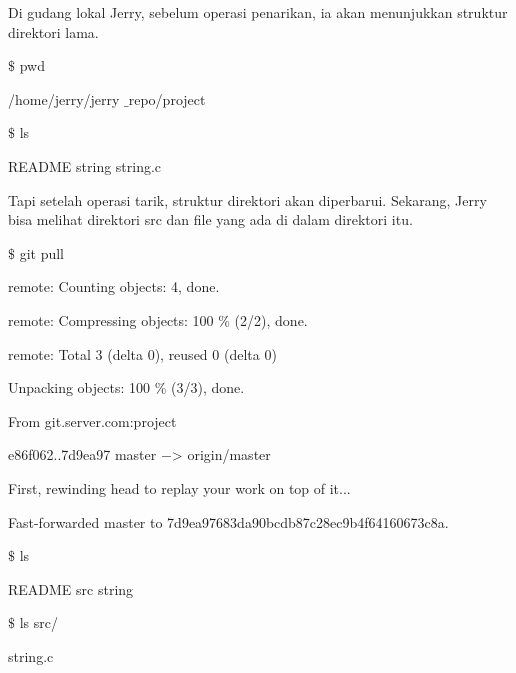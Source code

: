 \vspace{12pt}
\hspace*{0.5in} Di gudang lokal Jerry, sebelum operasi penarikan, ia akan menunjukkan struktur direktori lama. \par

\vspace{12pt}
 $  \$  $ pwd \par
\noindent 
/home/jerry/jerry $  \_  $repo/project \par
\vspace{12pt}
 $  \$  $ ls \par
\noindent 
README string string.c \par

\vspace{12pt}
\noindent 
 \hspace*{0.5in} Tapi setelah operasi tarik, struktur direktori akan diperbarui. Sekarang, Jerry bisa melihat direktori src dan file yang ada di dalam direktori itu. \par
{} $  \$  $ git pull \par
\noindent 
remote: Counting objects: 4, done. \par
\noindent 
remote: Compressing objects: 100 $  \%  $ (2/2), done. \par
\noindent 
remote: Total 3 (delta 0), reused 0 (delta 0) \par
\noindent 
Unpacking objects: 100 $  \%  $ (3/3), done. \par
\noindent 
From git.server.com:project \par
\noindent 
e86f062..7d9ea97 master  $ - $> origin/master \par
\noindent 
First, rewinding head to replay your work on top of it... \par
\noindent 
Fast-forwarded master to 7d9ea97683da90bcdb87c28ec9b4f64160673c8a. \par
\vspace{12pt}
 $  \$  $ ls \par
\noindent 
README src string \par
\vspace{12pt}
 $  \$  $ ls src/ \par
\noindent 
string.c \par

